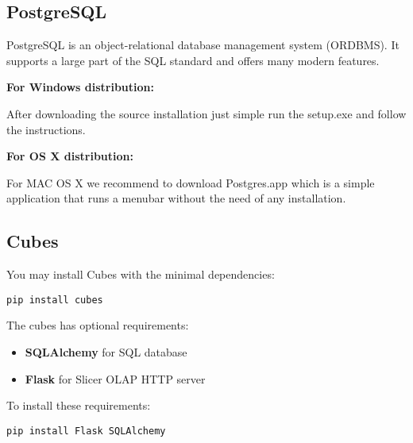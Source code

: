 \documentclass[letterpaper,12pt,oneside]{sphinxmanual}
\begin{document}
\subsection{PostgreSQL}
\label{apendixa:postgresql}
PostgreSQL is an object-relational database management system (ORDBMS).
It supports a large part of the SQL standard and offers many modern features.

\textbf{For Windows distribution:} 

After downloading the source installation just simple run the setup.exe and follow the instructions.

\textbf{For OS X distribution:} 

For MAC OS X we recommend to download Postgres.app which is a simple application that runs a menubar without the need of any installation.


\subsection{Cubes}
\label{apendixa:cubes}
You may install Cubes with the minimal dependencies:

\def\SphinxLiteralBlockLabel{\label{apendixa:install-cubes}}
\begin{Verbatim}[commandchars=\\\{\}]
pip install cubes
\end{Verbatim}
\let\SphinxVerbatimTitle\empty
\let\SphinxLiteralBlockLabel\empty

The cubes has optional requirements:
\begin{itemize}
\item {} 
\textbf{SQLAlchemy} for SQL database

\item {} 
\textbf{Flask} for Slicer OLAP HTTP server

\end{itemize}

To install these requirements:

\def\SphinxLiteralBlockLabel{\label{apendixa:cubes-requirements}}
\begin{Verbatim}[commandchars=\\\{\}]
pip install Flask SQLAlchemy
\end{Verbatim}
\let\SphinxVerbatimTitle\empty
\let\SphinxLiteralBlockLabel\empty
\end{document}
